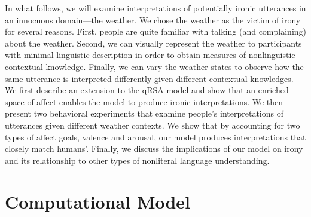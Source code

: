 \documentclass[10pt,letterpaper]{article}
\begin{document}




In what follows, we will examine interpretations of potentially ironic utterances in an innocuous domain---the weather. We chose the weather as the victim of irony for several reasons. First, people are quite familiar with talking (and complaining) about the weather. Second, we can visually represent the weather to participants with minimal linguistic description in order to obtain measures of nonlinguistic contextual knowledge. Finally, we can vary the weather states to observe how the same utterance is interpreted differently given different contextual knowledges. We first describe an extension to the qRSA model and show that an enriched space of affect enables the model to produce ironic interpretations. We then present two behavioral experiments that examine people's interpretations of utterances given different weather contexts. We show that by accounting for two types of affect goals, valence and arousal, our model produces interpretations that closely match humans'. Finally, we discuss the implications of our model on irony and its relationship to other types of nonliteral language understanding.


\section{Computational Model}


%
%
\end{document}
